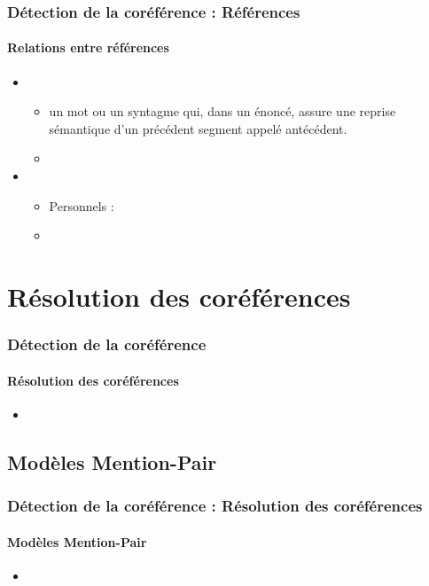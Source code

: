 \documentclass[xcolor=table]{beamer}
\begin{document}
\begin{frame}
	\frametitle{Détection de la coréférence : Références}
	\framesubtitle{Relations entre références}
	
	\begin{itemize}
		\item {}
		\begin{itemize}
			\item  un mot ou un syntagme qui, dans un énoncé, assure une reprise sémantique d'un précédent segment appelé antécédent.
			\item 
		\end{itemize}
	
		\item {}
		\begin{itemize}
			\item Personnels : 
			\item 
		\end{itemize}
	\end{itemize}
	
\end{frame}

\section{Résolution des coréférences}

\begin{frame}
	\frametitle{Détection de la coréférence}
	\framesubtitle{Résolution des coréférences}
	
	\begin{itemize}
		\item 
	\end{itemize}
	
\end{frame}


\subsection{Modèles Mention-Pair}

\begin{frame}
	\frametitle{Détection de la coréférence : Résolution des coréférences}
	\framesubtitle{Modèles Mention-Pair}
	
	\begin{itemize}
		\item 
	\end{itemize}
	
\end{frame}
\end{document}
